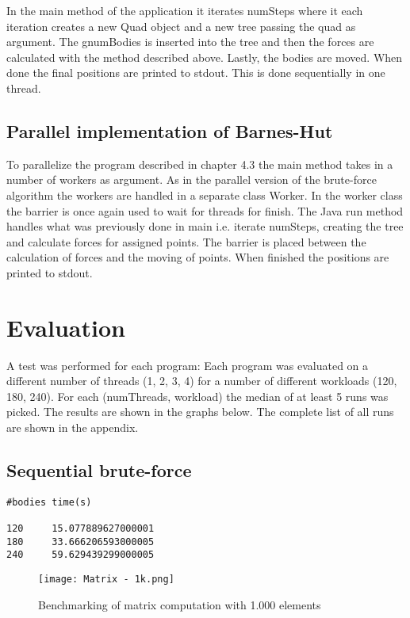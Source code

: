 \documentclass{article}
\begin{document}
In the main method of the application it iterates numSteps where it each iteration creates a new Quad object and a new tree passing the quad as argument. The gnumBodies is inserted into the tree and then the forces are calculated with the method described above. Lastly, the bodies are moved. When done the final positions are printed to stdout. This is done sequentially in one thread. 

\subsection{Parallel implementation of Barnes-Hut}

To parallelize the program described in chapter 4.3 the main method takes in a number of workers as argument. As in the parallel version of the brute-force algorithm the workers are handled in a separate class Worker. In the worker class the barrier is once again used to wait for threads for finish.  The Java run method handles what was previously done in main i.e. iterate numSteps, creating the tree and calculate forces for assigned points. The barrier is placed between the calculation of forces and the moving of points. When finished the positions are printed to stdout. 

\section{Evaluation}
A test was performed for each program: Each program was evaluated on a different number of threads (1, 2, 3, 4) for a number of different workloads (120, 180, 240). For each (numThreads, workload) the median of at least 5 runs was picked. The results are shown in the graphs below. The complete list of all runs are shown in the appendix.


\subsection{Sequential brute-force}
\begin{verbatim}
#bodies time(s)

120     15.077889627000001
180     33.666206593000005
240     59.629439299000005
\end{verbatim}
\begin{figure}[h]
\centering
\texttt{[image: Matrix - 1k.png]}
\caption{Benchmarking of matrix computation with 1.000 elements}
\end{figure}      
\end{document}
